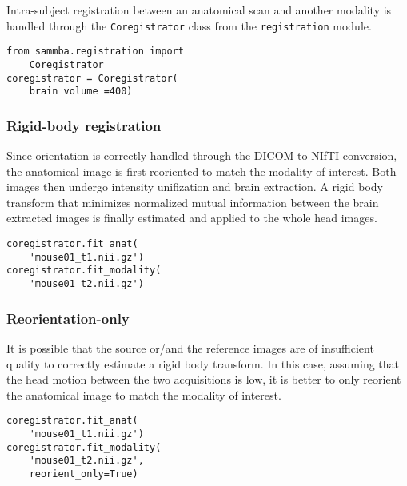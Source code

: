 \documentclass[utf8, a4paper, final, crop]{frontiersSCNS}
\newcommand{\pythoninline}[1]{\texttt{#1}}
\begin{document}
Intra-subject registration between an anatomical scan and another modality
is handled through the \pythoninline{Coregistrator} class from the
\pythoninline{registration} module. 
\begin{verbatim}
from sammba.registration import 
    Coregistrator
coregistrator = Coregistrator(
    brain volume =400)
\end{verbatim}

\subsubsection{Rigid-body registration}
Since orientation is correctly handled through the DICOM to NIfTI conversion,
the anatomical image is first reoriented to match the modality of interest.
Both images then undergo intensity unifization and brain extraction.
A rigid body
transform that minimizes normalized mutual information
between the brain extracted images is finally estimated and applied to the whole head images.
\begin{verbatim}
coregistrator.fit_anat(
    'mouse01_t1.nii.gz')
coregistrator.fit_modality(
    'mouse01_t2.nii.gz')
\end{verbatim}

\subsubsection{Reorientation-only}
It is possible that the source or/and the reference
images are of insufficient quality to correctly estimate a rigid body transform. In 
this case,
assuming that the head motion between the two acquisitions is low, it is better
to only reorient the anatomical image to match the modality of interest.
\begin{verbatim}
coregistrator.fit_anat(
    'mouse01_t1.nii.gz')
coregistrator.fit_modality(
    'mouse01_t2.nii.gz',
    reorient_only=True)
\end{verbatim}
\end{document}
